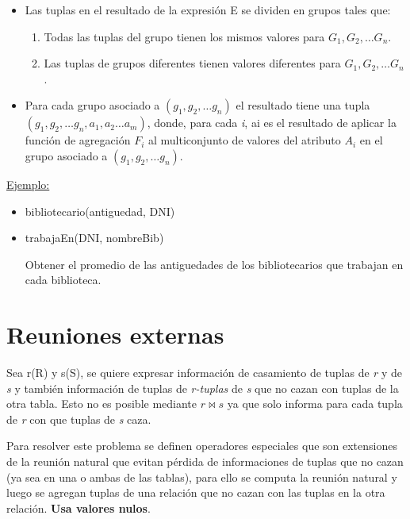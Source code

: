 \documentclass[12pt,a4paper]{report}
\begin{document}
		\begin{itemize}
			\item Las tuplas en el resultado de la expresión E se dividen en grupos tales que:
			\begin{enumerate}
				\item Todas las tuplas del grupo tienen los mismos valores para $G_{1}, G_{2}, \dotsc G_{n}$.
				\item Las tuplas de grupos diferentes tienen valores diferentes para $G_{1}, G_{2}, \dotsc G_{n}$.
			\end{enumerate}
		\item Para cada grupo asociado a $(g_{1}, g_{2}, \dotsc g_{n})$ el resultado tiene una tupla $(g_{1}, g_{2}, \dotsc g_{n}, a_{1}, a_{2} \dotsc a_{m})$, donde, para cada \textit{i}, ai es el resultado de aplicar la función de agregación $F_{i}$ al multiconjunto de valores del atributo $A_{i}$ en el grupo asociado a $(g_{1}, g_{2}, \dotsc g_{n})$.
		\end{itemize}
		
		\underline{Ejemplo:}
		\begin{itemize}
			\item bibliotecario(antiguedad, DNI)
			\item trabajaEn(DNI, nombreBib)
			\par Obtener el promedio de las antiguedades de los bibliotecarios que trabajan en cada biblioteca.
		\end{itemize}

	\section{Reuniones externas}
		\par Sea r(R) y s(S), se quiere expresar información de casamiento de tuplas de \textit{r} y de \textit{s} y también información de tuplas de \textit{r-tuplas} de \textit{s} que no cazan con tuplas de la otra tabla. Esto no es posible mediante $r \bowtie s$ ya que solo informa para cada tupla de \textit{r} con que tuplas de \textit{s} caza.
		\par Para resolver este problema se definen operadores especiales que son extensiones de la reunión natural que evitan pérdida de informaciones de tuplas que no cazan (ya sea en una o ambas de las tablas), para ello se computa la reunión natural y luego se agregan tuplas de una relación que no cazan con las tuplas en la otra relación. \textbf{Usa valores nulos}.
		
\end{document}
